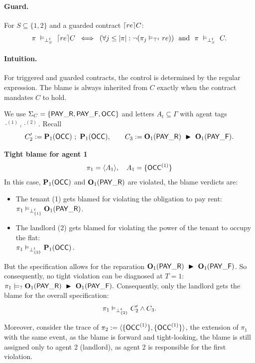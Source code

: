 \paragraph{Guard.}
For $S\subseteq\{1,2\}$ and a guarded contract $\guard[re]{C}$:
\[
\pi\ \vDash_{\bottp{S}}\ \guard[re]{C} \;\iff\;
(\forall j \le |\pi|: \neg(\pi_j \vDash_{\topt} re)) \ \nd\ \pi\ \vDash_{\bottp{S}}\ C.
\]
\paragraph{Intuition.} For triggered and guarded contracts, the control is determined by the regular expression. The blame is always inherited from $C$ exactly when the contract mandates $C$ to hold.


\begin{example}
We use $\Sigma_C=\{\PAY,\PAYF,\OCC\}$ and letters $A_t\subseteq\Gamma$ with agent tags $\cdot^{(1)},\cdot^{(2)}$.
Recall
\[
C_2' := \perm[1]{\OCC}\ ;\ \perm[1]{\OCC},\qquad
C_3 := \obl[1]{\PAY}\ \repair\ \obl[1]{\PAYF}.
\]


\medskip
\noindent\textbf{Tight blame for agent 1 }
\[
\pi_1=\langle A_1\rangle,\quad A_1=\{\OCC^{(1)}\}
\]
In this case, $\perm[1]{\OCC}$ and $ \obl[1]{\PAY}$ are violated, the blame verdicts are:
\begin{itemize}
\item The tenant (1) gets blamed for violating the obligation to pay rent:\\ $\pi_1 \vDash_{\bottp{\{1\}}} \obl[1]{\PAY}$. 
\item The landlord (2) gets blamed for violating the power of the tenant to occupy the flat:\\
$\pi_1 \vDash_{\bottp{\{2\}}} \perm[1]{\OCC}$.
\end{itemize}
But the specification allows for the reparation $\obl[1]{\PAY}\ \repair\ \obl[1]{\PAYF}$. So consequently, no tight violation can be diagnosed at $T=1$:\\
$\pi_1 \presat \obl[1]{\PAY}\ \repair\ \obl[1]{\PAYF}.$
Consequently, only the landlord gets the blame for the overall specification:
\[\pi_1 \vDash_{\bottp{\{2\}}} C_2' \wedge C_3.\]

Moreover, consider the trace of  $\pi_2:= \trace{\{\OCC^{(1)}\}, \{\OCC^{(1)}\}}$, the extension of $\pi_1$ with the same event, as the blame is forward and tight-looking, the blame is still assigned only to agent $2$ (landlord), as agent 2 is responsible for the first violation.


\end{example}

